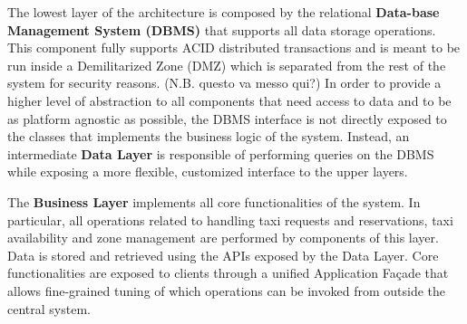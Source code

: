 \begin{figure}[H]
\centering
{}
\end{figure}
\vspace{5mm}
The lowest layer of the architecture is composed by the relational \textbf{Data-base Management System (DBMS)} that supports all data storage operations. This component fully supports ACID distributed transactions and is meant to be run inside a Demilitarized Zone (DMZ) which is separated from the rest of the system for security reasons. (N.B. questo va messo qui?)
In order to provide a higher level of abstraction to all components that need access to data and to be as platform agnostic as possible, the DBMS interface is not directly exposed to the classes that implements the business logic of the system. Instead, an intermediate \textbf{Data Layer} is responsible of performing queries on the DBMS while exposing a more flexible, customized interface to the upper layers.

The \textbf{Business Layer} implements all core functionalities of the system. In particular, all operations related to handling taxi requests and reservations, taxi availability and zone management are performed by components of this layer. Data is stored and retrieved using the APIs exposed by the Data Layer. Core functionalities are exposed to clients through a unified Application Façade that allows fine-grained tuning of which operations can be invoked from outside the central system.

